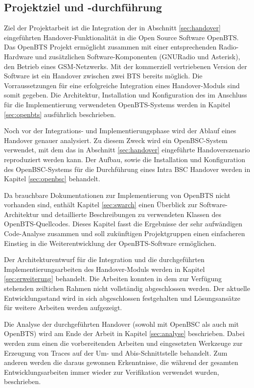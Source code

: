 \subsection{Projektziel und -durchführung}

Ziel der Projektarbeit ist die Integration der in Abschnitt \ref{sec:handover} eingeführten Handover-Funktionalität in die Open Source Software OpenBTS. Das OpenBTS Projekt ermöglicht zusammen mit einer entsprechenden Radio-Hardware und zusätzlichen Software-Komponenten (GNURadio und Asterisk), den Betrieb eines GSM-Netzwerks. Mit der kommerziell vertriebenen Version der Software ist ein Handover zwischen zwei BTS bereits möglich. Die Vorraussetzungen für eine erfolgreiche Integration eines Handover-Moduls sind somit gegeben. Die Architektur, Installation und Konfiguration des im Anschluss für die Implementierung verwendeten OpenBTS-Systems werden in Kapitel \ref{sec:openbts} ausführlich beschrieben.

Noch vor der Integrations- und Implementierungsphase wird der Ablauf eines Handover genauer analysiert. Zu diesem Zweck wird ein OpenBSC-System verwendet, mit dem das in Abschnitt \ref{sec:handover} eingeführte Handoverszenario reproduziert werden kann. Der Aufbau, sowie die Installation und Konfiguration des OpenBSC-Systems für die Durchführung eines Intra BSC Handover werden in Kapitel \ref{sec:openbsc} behandelt.

Da brauchbare Dokumentationen zur Implementierung von OpenBTS nicht vorhanden sind, enthält Kapitel \ref{sec:swarch} einen Überblick zur Software-Architektur und detaillierte Beschreibungen zu verwendeten Klassen des OpenBTS-Quellcodes. Dieses Kapitel fasst die Ergebnisse der sehr aufwändigen Code-Analyse zusammen und soll zukünftigen Projektgruppen einen einfacheren Einstieg in die Weiterentwicklung der OpenBTS-Software ermöglichen.

Der Architekturentwurf für die Integration und die durchgeführten Implementierungsarbeiten des Handover-Moduls werden in Kapitel \ref{sec:erweiterung} behandelt. Die Arbeiten konnten in dem zur Verfügung stehenden zeiltichen Rahmen nicht vollständig abgeschlossen werden. Der aktuelle Entwicklungsstand wird in sich abgeschlossen festgehalten und Lösungsansätze für weitere Arbeiten werden aufgezeigt.

Die Analyse der durchgeführten Handover (sowohl mit OpenBSC als auch mit OpenBTS) wird am Ende der Arbeit in Kapitel \ref{sec:analyse} beschrieben. Dabei werden zum einen die vorbereitenden Arbeiten und eingesetzten Werkzeuge zur Erzeugung von Traces auf der Um- und Abis-Schnittstelle behandelt. Zum anderen werden die daraus gewonnen Erkenntnisse, die während der gesamten Entwicklungsarbeiten immer wieder zur Verifikation verwendet wurden, beschrieben.
